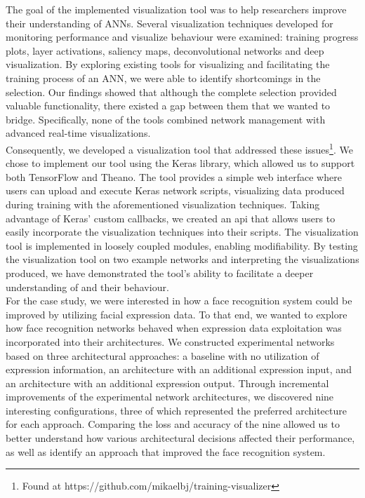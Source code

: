 The goal of the implemented visualization tool was to help researchers improve their understanding of ANNs. Several visualization techniques developed for monitoring performance and visualize behaviour were examined: training progress plots, layer activations, saliency maps, deconvolutional networks and deep visualization. By exploring existing tools for visualizing and facilitating the training process of an ANN, we were able to identify shortcomings in the selection. Our findings showed that although the complete selection provided valuable functionality, there existed a gap between them that we wanted to bridge. Specifically, none of the tools combined network management with advanced real-time visualizations. \\

\noindent Consequently, we developed a visualization tool that addressed these issues\footnote{Found at https://github.com/mikaelbj/training-visualizer}. We chose to implement our tool using the Keras library, which allowed us to support both TensorFlow and Theano. The tool provides a simple web interface where users can upload and execute Keras network scripts, visualizing data produced during training with the aforementioned visualization techniques. Taking advantage of Keras' custom callbacks, we created an \acrshort{api} that allows users to easily incorporate the visualization techniques into their scripts. The visualization tool is implemented in loosely coupled modules, enabling modifiability. By testing the visualization tool on two example networks and interpreting the visualizations produced, we have demonstrated the tool's ability to facilitate a deeper understanding of  and their behaviour. \\

\noindent For the case study, we were interested in how a face recognition system could be improved by utilizing facial expression data. To that end, we wanted to explore how face recognition networks behaved when expression data exploitation was incorporated into their architectures. We constructed experimental networks based on three architectural approaches: a baseline with no utilization of expression information, an architecture with an additional expression input, and an architecture with an additional expression output. Through incremental improvements of the experimental network architectures, we discovered nine interesting configurations, three of which represented the preferred architecture for each approach. Comparing the loss and accuracy of the nine allowed us to better understand how various architectural decisions affected their performance, as well as identify an approach that improved the face recognition system. \\


